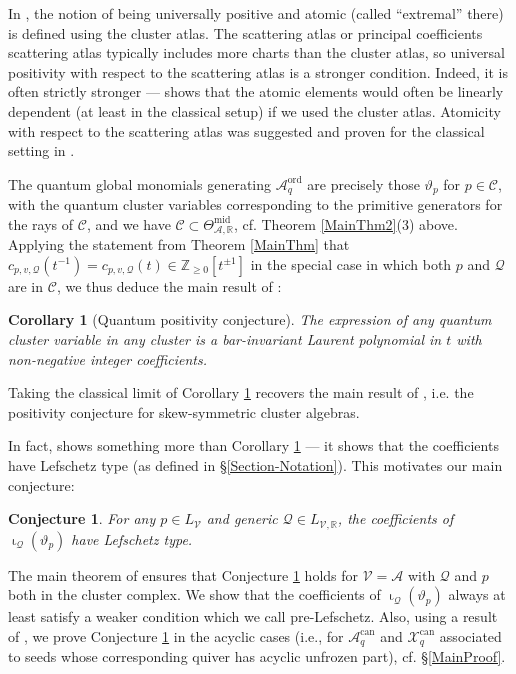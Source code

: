 \documentclass{amsart}
\DeclareMathOperator{\midd}{mid}
\DeclareMathOperator{\ord}{ord}
\DeclareMathOperator{\can}{can}
\let\bb=\mathbb
\let\s=\mathcal
\newcommand {\sQ} {\mathcal{Q}}
\renewcommand{\iota}{\upiota}
\theoremstyle{plain}%
\newtheorem{conj}[thm]{Conjecture}
\newtheorem{cor}[thm]{Corollary}
\theoremstyle{definition}
\theoremstyle{remark}
\begin{document}
In \cite{FG1}, the notion of being universally positive and atomic (called ``extremal'' there) is defined using the cluster atlas.  The scattering atlas or principal coefficients scattering atlas typically includes more charts than the cluster atlas, so universal positivity with respect to the scattering atlas is a stronger condition.  Indeed, it is often strictly stronger --- \cite[Thm 1.2]{LLZ} shows that the atomic elements would  often be linearly dependent (at least in the classical setup) if we used the cluster atlas.  Atomicity with respect to the scattering atlas was suggested and proven for the classical setting in \cite{ManAtomic}.

The quantum global monomials generating $\s{A}_q^{\ord}$ are precisely those $\vartheta_p$ for $p\in \s{C}$, with the quantum cluster variables corresponding to the primitive generators for the rays of $\s{C}$, and we have $\s{C}\subset \Theta_{\s{A},\bb{R}}^{\midd}$, cf. Theorem \ref{MainThm2}(3) above. 
Applying the statement from Theorem \ref{MainThm} that $c_{p,v,\sQ}(t^{-1})=c_{p,v,\sQ}(t)\in\mathbb{Z}_{\geq 0}[t^{\pm 1}]$ in the special case in which both $p$ and $\sQ$ are in $\s{C}$, we thus deduce the main result of \cite{DavPos}:
\begin{cor}[Quantum positivity conjecture]\label{posLaurent}
The expression of any quantum cluster variable in any cluster is a bar-invariant Laurent polynomial in $t$ with non-negative integer coefficients. 
\end{cor}

Taking the classical limit of Corollary \ref{posLaurent} recovers the main result of \cite{LS}, i.e. the positivity conjecture for skew-symmetric cluster algebras.


In fact, \cite{DavPos} shows something more than Corollary \ref{posLaurent} --- it shows that the coefficients have Lefschetz type (as defined in \S \ref{Section-Notation}).  This motivates our main conjecture:
\begin{conj}\label{MainConj}
For any $p\in L_{\s{V}}$ and generic $\sQ\in L_{\s{V},\bb{R}}$, the coefficients of $\iota_{\sQ}(\vartheta_p)$ have Lefschetz type.  
\end{conj}
The main theorem of \cite{DavPos} ensures that Conjecture \ref{MainConj} holds for $\s{V}=\s{A}$ with $\sQ$ and $p$ both in the cluster complex.  We show that the coefficients of $\iota_{\sQ}(\vartheta_p)$ always at least satisfy a weaker condition which we call pre-Lefschetz.  Also, using a result of \cite{MeiRei}, we prove Conjecture \ref{MainConj} in the acyclic cases (i.e., for $\s{A}_q^{\can}$ and $\s{X}_q^{\can}$   associated to seeds whose corresponding quiver has acyclic unfrozen part), cf. \S \ref{MainProof}.
\end{document}
